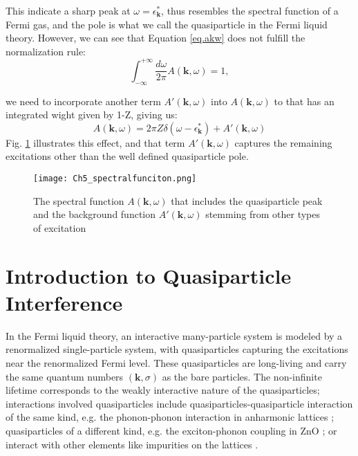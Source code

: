 This indicate a sharp peak at $\omega=\epsilon^*_\textbf{k}$, thus resembles the spectral function of a Fermi gas, and the pole is what we call the quasiparticle in the Fermi liquid theory. However, we can see that Equation \ref{eq.akw} does not fulfill the normalization rule: 
\begin{equation}
	\int_{-\infty}^{+\infty} \frac{d\omega}{2\pi} A(\textbf{k},\omega) = 1, 
\end{equation}

we need to incorporate another term $A'(\textbf{k},\omega)$ into $ A(\textbf{k},\omega)$ to that has an integrated wight given by 1-Z, giving us: 
\begin{equation}
	\label{eq.akw}
	A(\textbf{k},\omega) = 2\pi Z\delta(\omega-\epsilon^*_\textbf{k}) + A'(\textbf{k},\omega)
\end{equation}
Fig. \ref{fig:ch5_spect} \cite{bruusManyBodyQuantum2004} illustrates this effect, and that term $A'(\textbf{k},\omega)$ captures the remaining excitations other than the well defined quasiparticle pole. 

\begin{figure}
	\centering
	\texttt{[image: Ch5\_spectralfunciton.png]}
	\caption{The spectral function $A(\textbf{k},\omega)$ that includes the quasiparticle peak and the background function $A'(\textbf{k},\omega)$ stemming from other types of excitation}
	\label{fig:ch5_spect}
\end{figure}

\section{Introduction to Quasiparticle Interference}

In the Fermi liquid theory, an interactive many-particle system is modeled by a renormalized single-particle system, with quasiparticles capturing the excitations near the renormalized Fermi level. These quasiparticles are long-living and carry the same quantum numbers $(\textbf{k}, \sigma)$ as the bare particles. The non-infinite lifetime corresponds to the weakly interactive nature of the quasiparticles; interactions involved quasiparticles include quasiparticles-quasiparticle interaction of the same kind, e.g. the phonon-phonon interaction in anharmonic lattices \cite{kimExploringAnharmonicLattice2023}; quasiparticles of a different kind, e.g. the exciton-phonon coupling in ZnO \cite{mendelsbergPhotoluminescenceExcitonphononCoupling2011}; or interact with other elements like impurities on the lattices \cite{avrahamQuasiparticleInterferenceStudies2018}. 

